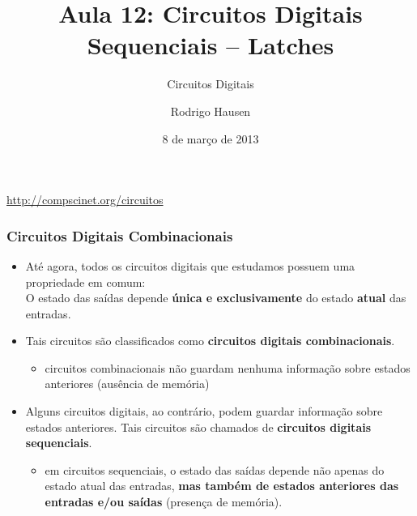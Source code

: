 \documentclass{beamer}
\title{Aula 12: Circuitos Digitais Sequenciais -- Latches}
\subtitle{Circuitos Digitais}
\author{Rodrigo Hausen}
\institute{CMCC -- UFABC}
\date{8 de março de 2013}
\begin{document}
\begin{frame}
\maketitle

\vspace{-1cm}

\begin{center}
\url{http://compscinet.org/circuitos}
\end{center}

\end{frame}

\begin{frame}
\frametitle{Circuitos Digitais Combinacionais}

\begin{itemize}
\item Até agora, todos os circuitos digitais que estudamos
      possuem uma propriedade em comum:\\
      O estado das saídas depende \textbf{única e exclusivamente}
      do estado \textbf{atual} das entradas.
\pause
\item Tais circuitos são classificados como \textbf{circuitos digitais
      combinacionais}.
	\begin{itemize}
	\item circuitos combinacionais não guardam nenhuma informação
              sobre estados anteriores (ausência de memória)
	\end{itemize}
\pause
\item Alguns circuitos digitais, ao contrário, podem guardar informação
      sobre estados anteriores. Tais circuitos são chamados de
      \textbf{circuitos digitais sequenciais}.
	\begin{itemize}
	\item em circuitos sequenciais, o estado das saídas depende não
              apenas do estado atual das entradas, \textbf{mas também de
              estados anteriores das entradas e/ou saídas} (presença de
              memória).
	\end{itemize}
\end{itemize}
\end{frame}
\end{document}

